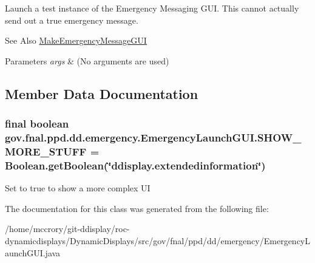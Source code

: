 Launch a test instance of the Emergency Messaging G\-U\-I. This cannot actually send out a true emergency message. \begin{DoxySeeAlso}{See Also}
\hyperlink{classgov_1_1fnal_1_1ppd_1_1dd_1_1emergency_1_1MakeEmergencyMessageGUI}{Make\-Emergency\-Message\-G\-U\-I}
\end{DoxySeeAlso}

\begin{DoxyParams}{Parameters}
{\em args} & (No arguments are used) \\
\hline
\end{DoxyParams}


\subsection{Member Data Documentation}
\hypertarget{classgov_1_1fnal_1_1ppd_1_1dd_1_1emergency_1_1EmergencyLaunchGUI_a38b676d30b6ac1c12dbc4b790f93b729}{
\subsubsection[{S\-H\-O\-W\-\_\-\-M\-O\-R\-E\-\_\-\-S\-T\-U\-F\-F}]{\setlength{\rightskip}{0pt plus 5cm}final boolean gov.\-fnal.\-ppd.\-dd.\-emergency.\-Emergency\-Launch\-G\-U\-I.\-S\-H\-O\-W\-\_\-\-M\-O\-R\-E\-\_\-\-S\-T\-U\-F\-F = Boolean.\-get\-Boolean(\char`\"{}ddisplay.\-extendedinformation\char`\"{})\hspace{0.3cm}{\ttfamily [static]}}}\label{classgov_1_1fnal_1_1ppd_1_1dd_1_1emergency_1_1EmergencyLaunchGUI_a38b676d30b6ac1c12dbc4b790f93b729}
Set to true to show a more complex U\-I 

The documentation for this class was generated from the following file\-:\begin{DoxyCompactItemize}
\item 
/home/mccrory/git-\/ddisplay/roc-\/dynamicdisplays/\-Dynamic\-Displays/src/gov/fnal/ppd/dd/emergency/Emergency\-Launch\-G\-U\-I.\-java\end{DoxyCompactItemize}

